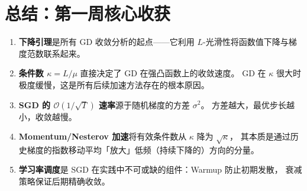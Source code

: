 \documentclass[12pt,a4paper]{ctexart}
\theoremstyle{definition}
\theoremstyle{plain}
\begin{document}
\section{总结：第一周核心收获}

\begin{enumerate}[label=(\arabic*)]
  \item \textbf{下降引理}是所有 GD 收敛分析的起点——它利用 $L$-光滑性将函数值下降与梯度范数联系起来。
  \item \textbf{条件数 $\kappa = L/\mu$} 直接决定了 GD 在强凸函数上的收敛速度。
    GD 在 $\kappa$ 很大时极度缓慢，这是所有后续加速方法存在的根本原因。
  \item \textbf{SGD 的 $\mathcal{O}(1/\sqrt{T})$ 速率}源于随机梯度的方差 $\sigma^2$。
    方差越大，最优步长越小，收敛越慢。
  \item \textbf{Momentum/Nesterov 加速}将有效条件数从 $\kappa$ 降为 $\sqrt{\kappa}$，
    其本质是通过历史梯度的指数移动平均「放大」低频（持续下降的）方向的分量。
  \item \textbf{学习率调度}是 SGD 在实践中不可或缺的组件：Warmup 防止初期发散，
    衰减策略保证后期精确收敛。
\end{enumerate}
\end{document}
